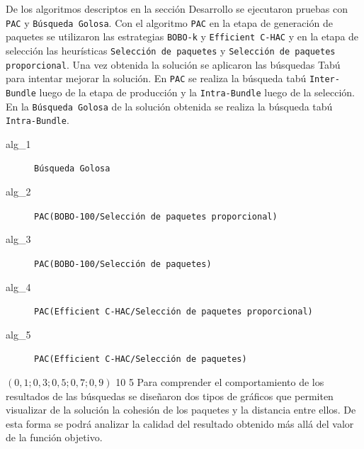 De los algoritmos descriptos en la sección Desarrollo se ejecutaron pruebas con \texttt{PAC} y \texttt{Búsqueda Golosa}. Con el algoritmo \texttt{PAC} en la etapa de generación de paquetes se utilizaron las estrategias \texttt{BOBO-k} y \texttt{Efficient C-HAC} y en la etapa de selección las heurísticas \texttt{Selección de paquetes} y \texttt{Selección de paquetes proporcional}. Una vez obtenida la solución se aplicaron las búsquedas Tabú para intentar mejorar la solución. En \texttt{PAC} se realiza la búsqueda tabú \texttt{Inter-Bundle} luego de la etapa de producción y la \texttt{Intra-Bundle} luego de la selección. En la \texttt{Búsqueda Golosa} de la solución obtenida se realiza la búsqueda tabú \texttt{Intra-Bundle}.\\

\Solucion
{}
{
\begin{description}
	\item[alg\_1] \texttt{Búsqueda Golosa}
	\item[alg\_2] \texttt{PAC(BOBO-100/Selección de paquetes proporcional)}
	\item[alg\_3] \texttt{PAC(BOBO-100/Selección de paquetes)}
	\item[alg\_4] \texttt{PAC(Efficient C-HAC/Selección de paquetes proporcional)}
	\item[alg\_5] \texttt{PAC(Efficient C-HAC/Selección de paquetes)}
\end{description}
}
{$(0,1; 0,3; 0,5; 0,7; 0,9)$}
{10}
{5}
Para comprender el comportamiento de los resultados de las búsquedas se diseñaron dos tipos de gráficos que permiten visualizar de la solución la cohesión de los paquetes y la distancia entre ellos. De esta forma se podrá analizar la calidad del resultado obtenido más allá del valor de la función objetivo.

